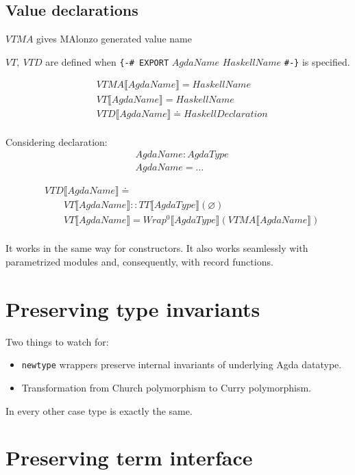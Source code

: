 \subsection{Value declarations}

\(VTMA\) gives MAlonzo generated value name

\(VT,\ VTD\) are defined when \texttt{\{-\# EXPORT} \(AgdaName\) \(HaskellName\) \texttt{\#-\}} is specified.

\begin{align*}
   &VTMA\llbracket AgdaName \rrbracket = HaskellName\\
   &VT\llbracket AgdaName \rrbracket = HaskellName\\
   &VTD\llbracket AgdaName \rrbracket \doteq HaskellDeclaration\\
\end{align*}

Considering declaration:
\begin{align*}
   &AgdaName : AgdaType\\
   &AgdaName = \ldots
\end{align*}

\begin{align*}
   &VTD\llbracket AgdaName \rrbracket \doteq\\
   &\quad\quad VT\llbracket AgdaName \rrbracket :: TT\llbracket AgdaType \rrbracket(\varnothing)\\
   &\quad\quad VT\llbracket AgdaName \rrbracket = Wrap^0\llbracket AgdaType \rrbracket(VTMA\llbracket AgdaName \rrbracket)\\
\end{align*}

It works in the same way for constructors.
It also works seamlessly with parametrized modules and, consequently, with record functions.

\section{Preserving type invariants}

Two things to watch for:
\begin{itemize}
\item \texttt{newtype} wrappers preserve internal invariants of underlying Agda datatype.
\item Transformation from Church polymorphism to Curry polymorphism.
\end{itemize}
In every other case type is exactly the same.

\section{Preserving term interface}

